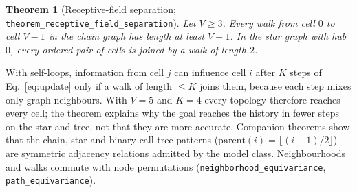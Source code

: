 \documentclass[10pt,twocolumn,letterpaper]{article}
\newtheorem{theorem}{Theorem}
\begin{document}
\begin{theorem}[Receptive-field separation; \texttt{theorem\_\allowbreak{}receptive\_\allowbreak{}field\_\allowbreak{}separation}]\label{thm:diameter}
Let $V\ge3$. Every walk from cell $0$ to cell $V{-}1$ in the chain graph has length at least $V{-}1$. In the star graph with hub $0$, every ordered pair of cells is joined by a walk of length $2$.
\end{theorem}
With self-loops, information from cell $j$ can influence cell $i$ after $K$ steps of Eq.~\eqref{eq:update} only if a walk of length $\le K$ joins them, because each step mixes only graph neighbours. With $V{=}5$ and $K{=}4$ every topology therefore reaches every cell; the theorem explains why the goal reaches the history in fewer steps on the star and tree, not that they are more accurate. Companion theorems show that the chain, star and binary call-tree patterns ($\mathrm{parent}(i) = \lfloor (i-1)/2\rfloor$) are symmetric adjacency relations admitted by the model class. Neighbourhoods and walks commute with node permutations (\texttt{neighborhood\_\allowbreak{}equivariance}, \texttt{path\_\allowbreak{}equivariance}).
\end{document}
